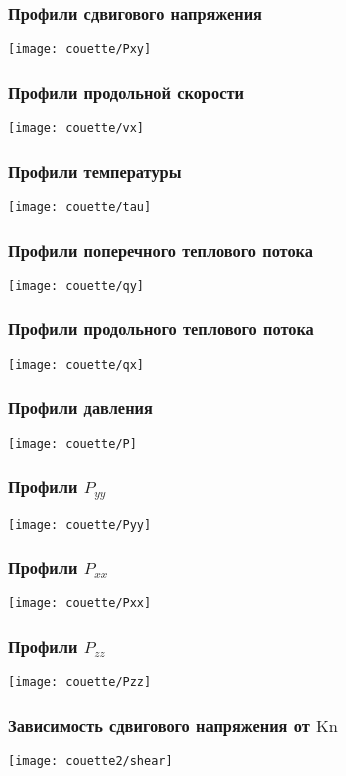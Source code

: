 \documentclass[mathserif]{beamer} %
\newcommand{\Kn}{\mathrm{Kn}}
\begin{document}
\begin{frame}
    \frametitle{Профили сдвигового напряжения}
    \centering
    \texttt{[image: couette/Pxy]}
\end{frame}

\begin{frame}
    \frametitle{Профили продольной скорости}
    \centering
    \texttt{[image: couette/vx]}
\end{frame}

\begin{frame}
    \frametitle{Профили температуры}
    \centering
    \texttt{[image: couette/tau]}
\end{frame}

\begin{frame}
    \frametitle{Профили поперечного теплового потока}
    \centering
    \texttt{[image: couette/qy]}
\end{frame}

\begin{frame}
    \frametitle{Профили продольного теплового потока}
    \centering
    \texttt{[image: couette/qx]}
\end{frame}

\begin{frame}
    \frametitle{Профили давления}
    \centering
    \texttt{[image: couette/P]}
\end{frame}

\begin{frame}
    \frametitle{Профили \(P_{yy}\)}
    \centering
    \texttt{[image: couette/Pyy]}
\end{frame}

\begin{frame}
    \frametitle{Профили \(P_{xx}\)}
    \centering
    \texttt{[image: couette/Pxx]}
\end{frame}

\begin{frame}
    \frametitle{Профили \(P_{zz}\)}
    \centering
    \texttt{[image: couette/Pzz]}
\end{frame}


\begin{frame}
    \frametitle{Зависимость сдвигового напряжения от \(\Kn\)}
    \vspace{-2pt}
    \centering\hspace{-1.5cm}
    \texttt{[image: couette2/shear]}
    \hspace{-1.5cm}
\end{frame}
\end{document}
